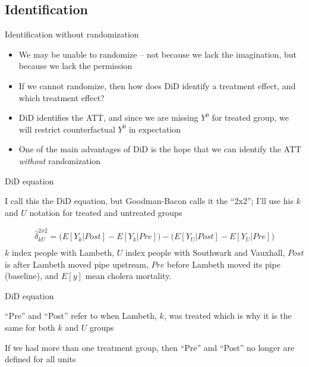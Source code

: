 \documentclass{beamer}
\begin{document}
\subsection{Identification}

\begin{frame}{Identification without randomization}

\begin{itemize}
\item We may be unable to randomize -- not because we lack the imagination, but because we lack the permission
\item If we cannot randomize, then how does DiD identify a treatment effect, and which treatment effect?
\item DiD identifies the ATT, and since we are missing $Y^0$ for treated group, we will restrict counterfactual $Y^0$ in expectation
\item One of the main advantages of DiD is the hope that we can identify the ATT \emph{without} randomization
\end{itemize}

\end{frame}




\begin{frame}{DiD equation}

I call this the DiD equation, but Goodman-Bacon calls it the ``2x2''; I'll use his $k$ and $U$ notation for treated and untreated groups

\begin{eqnarray*}
\widehat{\delta}^{2x2}_{kU} = \bigg ( E[Y_k|Post] - E[Y_k|Pre] \bigg ) - \bigg ( E[Y_U | Post ] - E[ Y_U | Pre] \bigg) \\
\end{eqnarray*}$k$ index people with Lambeth, $U$ index people with Southwark and Vauxhall, $Post$ is after Lambeth moved pipe upstream, $Pre$ before Lambeth moved its pipe (baseline), and $E[y]$ mean cholera mortality. 

\end{frame}

\begin{frame}{DiD equation}

``Pre'' and ``Post'' refer to when Lambeth, $k$, was treated which is why it is the same for both $k$ and $U$ groups

\bigskip

If we had more than one treatment group, then ``Pre'' and ``Post'' no longer are defined for all units

\end{frame}
\end{document}
